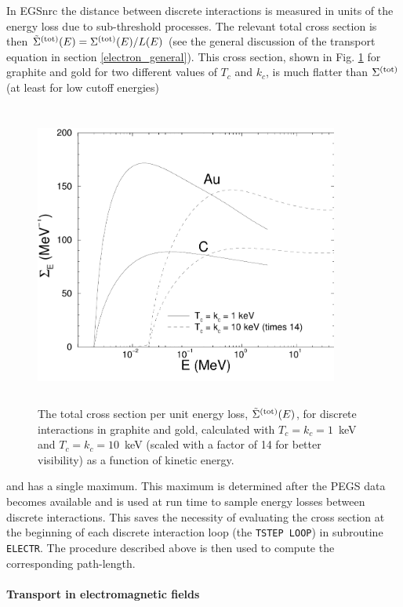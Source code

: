 In EGSnrc the distance between discrete interactions is measured
in units of the energy loss due to sub-threshold processes.
The relevant total cross section is then
$\tilde{\Sigma}^{\rm (tot)}(E) = \Sigma^{\rm (tot)}(E)/L(E)$
(see the general discussion
of the transport equation in section \ref{electron_general}).
This cross section, shown in Fig. \ref{tilde_sigma} for graphite and gold
for two different values of $T_c$ and $k_c$,
is much flatter than $\Sigma^{\rm (tot)}$
(at least for low cutoff energies)
\begin{figure}[htp]
\includegraphics[height=10cm,width=10cm]{figures/cse_all}
\caption[Total cross sections per unit energy loss]{\label{tilde_sigma}
The total cross section
per unit energy loss, $\tilde{\Sigma}^{\rm (tot)}(E)$, for
discrete interactions in graphite and gold, calculated with
$T_c = k_c = 1$~keV and $T_c = k_c = 10$~keV
(scaled with a factor of 14 for better visibility)
as a function of kinetic energy.}
\end{figure}
and has a single maximum. This maximum is determined after
the PEGS data becomes available and is used at run time to
sample energy losses between discrete interactions.
This saves the necessity of evaluating the cross section
at the beginning of each discrete interaction loop
(the {\tt TSTEP LOOP}) in subroutine {\tt ELECTR}.
The procedure described above
is then used to compute the corresponding path-length.

\paragraph{Transport in electromagnetic fields} \hfill
\label{EMF_macros_algorithm}

